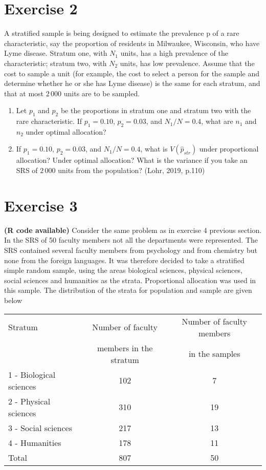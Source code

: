 \documentclass[12pt]{article}
\begin{document}
\section*{Exercise 2}
A stratified sample is being designed to estimate the prevalence p of a rare characteristic,
say the proportion of residents in Milwaukee, Wisconsin, who have Lyme
disease. Stratum one, with $N_1$ units, has a high prevalence of the characteristic; stratum
two, with $N_2$ units, has low prevalence. Assume that the cost to sample a unit (for
example, the cost to select a person for the sample and determine whether he or she
has Lyme disease) is the same for each stratum, and that at most $2\,000$ units are to be
sampled.
\begin{enumerate}
\item  Let $p_1$ and $p_2$ be the proportions in stratum one and stratum two with the rare characteristic.
If $p_1=0.10$, $p_2=0.03$, and $N_1/N = 0.4$, what are $n_1$ and $n_2$ under
optimal allocation?
\item If $p_1=0.10$, $p_2=0.03$, and $N_1/N = 0.4$, what is $V(\hat{p}_{str})$ under proportional
allocation? Under optimal allocation? What is the variance if you take an SRS of
$2\,000$ units from the population? \hfill (Lohr, 2019, p.110)
\end{enumerate}


\section*{Exercise 3}
\textbf{\color{ForestGreen}(R code available)} Consider the same problem as in exercise 4 previous section. In the SRS of 50 faculty members not all the departments were represented. The SRS contained several faculty members from psychology and from chemistry but none from the foreign languages. It was therefore decided to take a stratified simple random sample, using the areas biological sciences, physical sciences, social sciences and humanities as the strata. Proportional allocation was used in this sample. The distribution of the strata for population and sample are given below
	
\begin{center}
\begin{tabular}{lcc}
Stratum & Number of faculty & Number of faculty members\\
& members in the stratum & in the samples\\
\hline
1 - Biological sciences & 102 & 7\\
2 - Physical sciences & 310 & 19\\
3 - Social sciences & 217 & 13\\
4 - Humanities & 178 & 11\\
\hline
Total & 807 & 50\\
\end{tabular}
\end{center}
\end{document}
